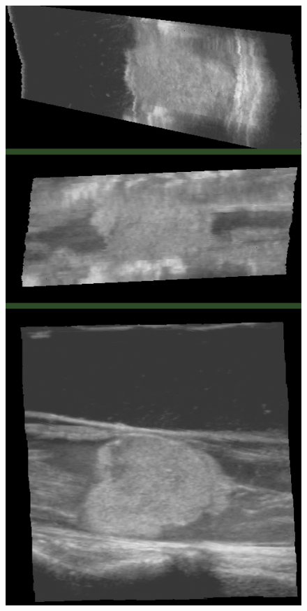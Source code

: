 \begin{figure}
\begin{minipage}[b]{0.326\textwidth}
	\label{fig:large_dwop4}
\end{minipage}
\hspace{0.01\textwidth}
\begin{minipage}[b]{0.326\textwidth}
	\centering
	\includegraphics[width=\textwidth]{graphics/large_dwop8.png}

\end{minipage}
\end{figure}
